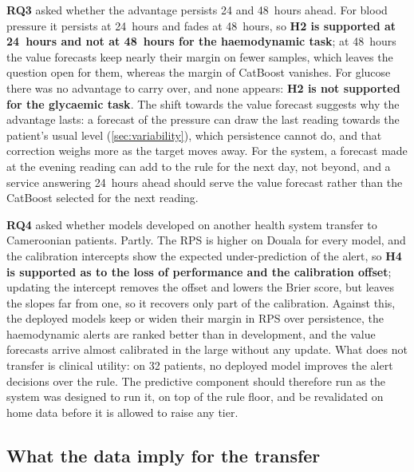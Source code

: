 \textbf{RQ3} asked whether the advantage persists 24 and 48~hours ahead. For blood pressure it persists at 24~hours and fades at 48~hours, so \textbf{H2 is supported at 24~hours and not at 48~hours for the haemodynamic task}; at 48~hours the value forecasts keep nearly their margin on fewer samples, which leaves the question open for them, whereas the margin of CatBoost vanishes. For glucose there was no advantage to carry over, and none appears: \textbf{H2 is not supported for the glycaemic task}. The shift towards the value forecast suggests why the advantage lasts: a forecast of the pressure can draw the last reading towards the patient's usual level (\cref{sec:variability}), which persistence cannot do, and that correction weighs more as the target moves away. For the system, a forecast made at the evening reading can add to the rule for the next day, not beyond, and a service answering 24~hours ahead should serve the value forecast rather than the CatBoost selected for the next reading.

\textbf{RQ4} asked whether models developed on another health system transfer to Cameroonian patients. Partly. The RPS is higher on Douala for every model, and the calibration intercepts show the expected under-prediction of the alert, so \textbf{H4 is supported as to the loss of performance and the calibration offset}; updating the intercept removes the offset and lowers the Brier score, but leaves the slopes far from one, so it recovers only part of the calibration. Against this, the deployed models keep or widen their margin in RPS over persistence, the haemodynamic alerts are ranked better than in development, and the value forecasts arrive almost calibrated in the large without any update. What does not transfer is clinical utility: on 32 patients, no deployed model improves the alert decisions over the rule. The predictive component should therefore run as the system was designed to run it, on top of the rule floor, and be revalidated on home data before it is allowed to raise any tier.

\subsection{What the data imply for the transfer}

